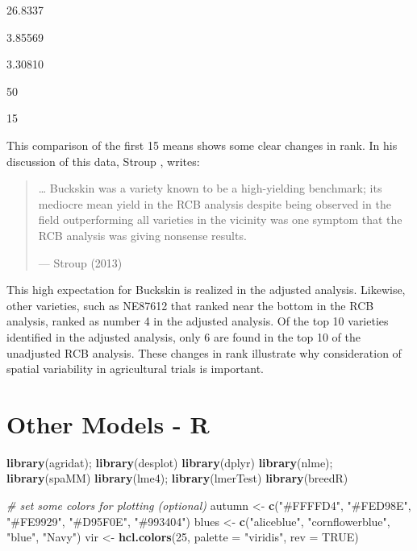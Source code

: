 \documentclass[
]{book}
\newenvironment{Shaded}{\begin{snugshade}}{\end{snugshade}}
\newcommand{\AttributeTok}[1]{\textcolor[rgb]{0.13,0.29,0.53}{#1}}
\newcommand{\CommentTok}[1]{\textcolor[rgb]{0.56,0.35,0.01}{\textit{#1}}}
\newcommand{\ConstantTok}[1]{\textcolor[rgb]{0.56,0.35,0.01}{#1}}
\newcommand{\DecValTok}[1]{\textcolor[rgb]{0.00,0.00,0.81}{#1}}
\newcommand{\FunctionTok}[1]{\textcolor[rgb]{0.13,0.29,0.53}{\textbf{#1}}}
\newcommand{\NormalTok}[1]{#1}
\newcommand{\OtherTok}[1]{\textcolor[rgb]{0.56,0.35,0.01}{#1}}
\newcommand{\StringTok}[1]{\textcolor[rgb]{0.31,0.60,0.02}{#1}}
\begin{document}
26.8337

3.85569

3.30810

50

15

This comparison of the first 15 means shows some clear changes in rank. In his discussion of this data, Stroup \citep{stroup2013}, writes:

\begin{quote}
\ldots{} Buckskin was a variety known to be a high-yielding benchmark; its mediocre mean yield in the RCB analysis despite being observed in the field outperforming all varieties in the vicinity was one symptom that the RCB analysis was giving nonsense results.

--- Stroup (2013)
\end{quote}

This high expectation for Buckskin is realized in the adjusted analysis. Likewise, other varieties, such as NE87612 that ranked near the bottom in the RCB analysis, ranked as number 4 in the adjusted analysis. Of the top 10 varieties identified in the adjusted analysis, only 6 are found in the top 10 of the unadjusted RCB analysis. These changes in rank illustrate why consideration of spatial variability in agricultural trials is important.

\hypertarget{model-extension-r}{%
\chapter{Other Models - R}\label{model-extension-r}}

\begin{Shaded}
\begin{Highlighting}[]
\FunctionTok{library}\NormalTok{(agridat); }\FunctionTok{library}\NormalTok{(desplot)}
\FunctionTok{library}\NormalTok{(dplyr)}
\FunctionTok{library}\NormalTok{(nlme); }\FunctionTok{library}\NormalTok{(spaMM)}
\FunctionTok{library}\NormalTok{(lme4); }\FunctionTok{library}\NormalTok{(lmerTest)}
\FunctionTok{library}\NormalTok{(breedR)}

\CommentTok{\# set some colors for plotting (optional)}
\NormalTok{autumn }\OtherTok{\textless{}{-}} \FunctionTok{c}\NormalTok{(}\StringTok{"\#FFFFD4"}\NormalTok{, }\StringTok{"\#FED98E"}\NormalTok{, }\StringTok{"\#FE9929"}\NormalTok{, }\StringTok{"\#D95F0E"}\NormalTok{, }\StringTok{"\#993404"}\NormalTok{)}
\NormalTok{blues }\OtherTok{\textless{}{-}} \FunctionTok{c}\NormalTok{(}\StringTok{"aliceblue"}\NormalTok{, }\StringTok{"cornflowerblue"}\NormalTok{, }\StringTok{"blue"}\NormalTok{, }\StringTok{"Navy"}\NormalTok{)}
\NormalTok{vir }\OtherTok{\textless{}{-}} \FunctionTok{hcl.colors}\NormalTok{(}\DecValTok{25}\NormalTok{, }\AttributeTok{palette =} \StringTok{"viridis"}\NormalTok{, }\AttributeTok{rev =} \ConstantTok{TRUE}\NormalTok{)}
\end{Highlighting}
\end{Shaded}
\end{document}
